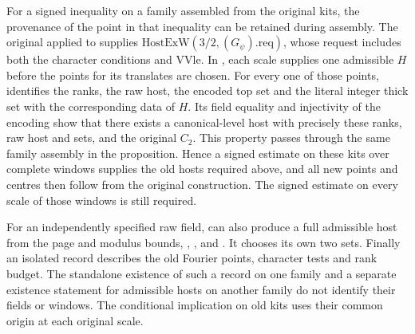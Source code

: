 For a signed inequality on a family assembled from the original kits,
the provenance of the point in that inequality can be retained during
assembly. The original  applied to
 supplies \(\mathrm{HostExW}(3/2,(G_\psi).\mathrm{req})\),
whose request includes both the character conditions and \(\mathrm{VVle}\).
In , each scale supplies one admissible \(H\)
before the points for its translates are chosen. For every one of those
points,  identifies the ranks, the raw host, the encoded
top set and the literal integer thick set with the corresponding data
of \(H\). Its field equality and injectivity of the encoding show that
there exists a canonical-level
 host with precisely these ranks, raw host and sets, and
the original \(C_2\). This property passes through the same family
assembly in the proposition. Hence a signed estimate on these kits over
complete windows supplies the old hosts required above, and all new
points and centres then follow from the original construction. The
signed estimate on every scale of those windows is still required.

For an independently specified raw field,  can also
produce a full admissible host from the page and modulus bounds,
, ,  and .
It chooses its own two sets. Finally an isolated 
record describes the old Fourier points, character tests and rank budget.
The standalone existence of such a record on one family and a separate
existence statement for admissible hosts on another family do not
identify their fields or windows. The conditional implication on
old kits uses their common origin at each original scale.

